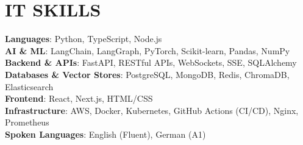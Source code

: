 \documentclass[letterpaper,11pt]{article}
\begin{document}
\vspace{7pt}
\section{IT SKILLS}
\vspace{5pt}
\textbf{Languages}: Python, TypeScript, Node.js \\
\textbf{AI \& ML}: LangChain, LangGraph, PyTorch, Scikit-learn, Pandas, NumPy \\
\textbf{Backend \& APIs}: FastAPI, RESTful APIs, WebSockets, SSE, SQLAlchemy \\
\textbf{Databases \& Vector Stores}: PostgreSQL, MongoDB, Redis, ChromaDB, Elasticsearch \\
\textbf{Frontend}: React, Next.js, HTML/CSS \\
\textbf{Infrastructure}: AWS, Docker, Kubernetes, GitHub Actions (CI/CD), Nginx, Prometheus \\
\textbf{Spoken Languages}: English (Fluent), German (A1) \\

\vspace{-16pt}
\end{document}
